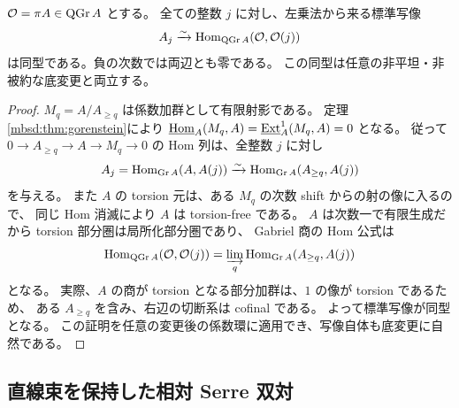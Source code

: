 \begin{corollary}[全整数の普遍切断飽和]
\label{mbsd:cor:saturation}
$\mathcal O=\pi A\in\operatorname{QGr} A$ とする。
全ての整数 $j$ に対し、左乗法から来る標準写像
\begin{equation}\label{mbsd:eq:saturation}
 A_j\xrightarrow{\sim}\operatorname{Hom}_{\operatorname{QGr} A}(\mathcal O,\mathcal O(j))
\end{equation}
は同型である。負の次数では両辺とも零である。
この同型は任意の非平坦・非被約な底変更と両立する。
\end{corollary}
\begin{proof}
$M_q=A/A_{\geq q}$ は係数加群として有限射影である。
定理\ref{mbsd:thm:gorenstein}により
$\underline{\operatorname{Hom}}_A(M_q,A)=\underline{\operatorname{Ext}}^1_A(M_q,A)=0$ となる。
従って $0\to A_{\geq q}\to A\to M_q\to0$ の Hom 列は、全整数 $j$ に対し
\[
 A_j=\operatorname{Hom}_{\operatorname{Gr} A}(A,A(j))
 \xrightarrow{\sim}\operatorname{Hom}_{\operatorname{Gr} A}(A_{\geq q},A(j))
\]
を与える。
また $A$ の torsion 元は、ある $M_q$ の次数 shift からの射の像に入るので、
同じ Hom 消滅により $A$ は torsion-free である。
$A$ は次数一で有限生成だから torsion 部分圏は局所化部分圏であり、
Gabriel 商の Hom 公式は
\[
 \operatorname{Hom}_{\operatorname{QGr} A}(\mathcal O,\mathcal O(j))
 =\varinjlim_q\operatorname{Hom}_{\operatorname{Gr} A}(A_{\geq q},A(j))
\]
となる\cite[Chapitre~III, \S1]{NFMGabrielQuotient}。
実際、$A$ の商が torsion となる部分加群は、$1$ の像が torsion であるため、
ある $A_{\geq q}$ を含み、右辺の切断系は cofinal である。
よって標準写像が同型となる。
この証明を任意の変更後の係数環に適用でき、写像自体も底変更に自然である。
\end{proof}

\subsection{直線束を保持した相対 Serre 双対}

